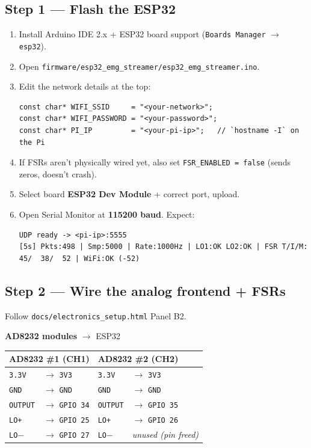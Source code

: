 \documentclass[10pt, a4paper]{article}
\begin{document}
\subsection*{Step 1 --- Flash the ESP32}

\begin{enumerate}
  \item Install Arduino IDE 2.x + ESP32 board support (\texttt{Boards Manager} $\rightarrow$ \texttt{esp32}).
  \item Open \texttt{firmware/esp32\_emg\_streamer/esp32\_emg\_streamer.ino}.
  \item Edit the network details at the top:
\begin{lstlisting}
const char* WIFI_SSID     = "<your-network>";
const char* WIFI_PASSWORD = "<your-password>";
const char* PI_IP         = "<your-pi-ip>";   // `hostname -I` on the Pi
\end{lstlisting}
  \item If FSRs aren't physically wired yet, also set \texttt{FSR\_ENABLED = false} (sends zeros, doesn't crash).
  \item Select board \textbf{ESP32 Dev Module} + correct port, upload.
  \item Open Serial Monitor at \textbf{115200 baud}. Expect:
\begin{lstlisting}
UDP ready -> <pi-ip>:5555
[5s] Pkts:498 | Smp:5000 | Rate:1000Hz | LO1:OK LO2:OK | FSR T/I/M:   45/  38/  52 | WiFi:OK (-52)
\end{lstlisting}
\end{enumerate}

\subsection*{Step 2 --- Wire the analog frontend + FSRs}

Follow \texttt{docs/electronics\_setup.html} Panel B2.

\vspace{4pt}
\noindent\textbf{AD8232 modules} $\rightarrow$ ESP32
\begin{tabular}{@{}llll@{}}
\toprule
\multicolumn{2}{l}{\textbf{AD8232 \#1 (CH1)}} & \multicolumn{2}{l}{\textbf{AD8232 \#2 (CH2)}} \\
\midrule
\texttt{3.3V}   & $\rightarrow$ \texttt{3V3}      & \texttt{3.3V}   & $\rightarrow$ \texttt{3V3}        \\
\texttt{GND}    & $\rightarrow$ \texttt{GND}      & \texttt{GND}    & $\rightarrow$ \texttt{GND}        \\
\texttt{OUTPUT} & $\rightarrow$ \texttt{GPIO 34}  & \texttt{OUTPUT} & $\rightarrow$ \texttt{GPIO 35}    \\
\texttt{LO+}    & $\rightarrow$ \texttt{GPIO 25}  & \texttt{LO+}    & $\rightarrow$ \texttt{GPIO 26}    \\
\texttt{LO$-$}  & $\rightarrow$ \texttt{GPIO 27}  & \texttt{LO$-$}  & \emph{unused (pin freed)}         \\
\bottomrule
\end{tabular}
\end{document}
